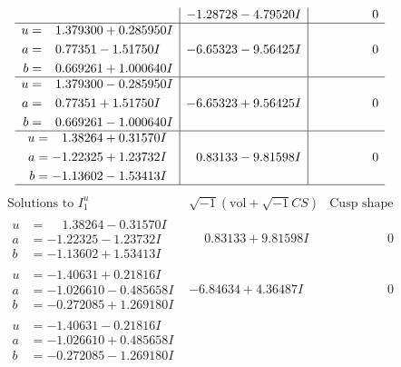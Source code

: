 \documentclass[1p]{elsarticle_modified}
\theoremstyle{definition}
\newcommand{\I}{\sqrt{-1}}
\begin{document}
$$\begin{array}{c|c|c}
 & -1.28728 - 4.79520 I & \phantom{-0.000000 } 0 \\ \hline\begin{aligned}
u &= \phantom{-}1.379300 + 0.285950 I \\
a &= \phantom{-}0.77351 - 1.51750 I \\
b &= \phantom{-}0.669261 + 1.000640 I\end{aligned}
 & -6.65323 - 9.56425 I & \phantom{-0.000000 } 0 \\ \hline\begin{aligned}
u &= \phantom{-}1.379300 - 0.285950 I \\
a &= \phantom{-}0.77351 + 1.51750 I \\
b &= \phantom{-}0.669261 - 1.000640 I\end{aligned}
 & -6.65323 + 9.56425 I & \phantom{-0.000000 } 0 \\ \hline\begin{aligned}
u &= \phantom{-}1.38264 + 0.31570 I \\
a &= -1.22325 + 1.23732 I \\
b &= -1.13602 - 1.53413 I\end{aligned}
 & \phantom{-}0.83133 - 9.81598 I & \phantom{-0.000000 } 0\\
 \hline 
 \end{array}$$\newpage$$\begin{array}{c|c|c}  
\text{Solutions to }I^u_{1}& \I (\text{vol} + \sqrt{-1}CS) & \text{Cusp shape}\\
 \hline 
\begin{aligned}
u &= \phantom{-}1.38264 - 0.31570 I \\
a &= -1.22325 - 1.23732 I \\
b &= -1.13602 + 1.53413 I\end{aligned}
 & \phantom{-}0.83133 + 9.81598 I & \phantom{-0.000000 } 0 \\ \hline\begin{aligned}
u &= -1.40631 + 0.21816 I \\
a &= -1.026610 - 0.485658 I \\
b &= -0.272085 + 1.269180 I\end{aligned}
 & -6.84634 + 4.36487 I & \phantom{-0.000000 } 0 \\ \hline\begin{aligned}
u &= -1.40631 - 0.21816 I \\
a &= -1.026610 + 0.485658 I \\
b &= -0.272085 - 1.269180 I\end{aligned}

\end{array}$$
\end{document}
